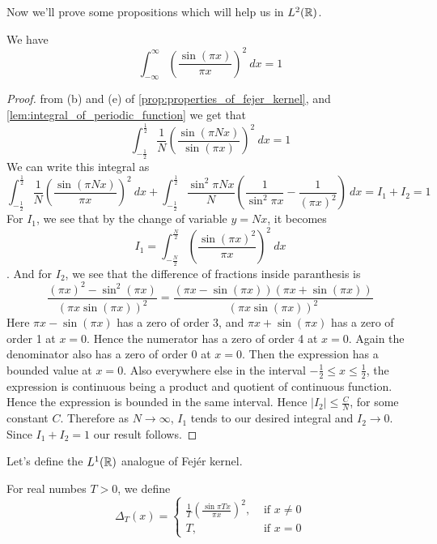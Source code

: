 Now we'll prove some propositions which will help us in $L^2(\mathbb R)$. 
\begin{proposition}
  \label{prop:integral_of_sin(pi_x)^2/(pi_x)^2}
  We have $$\int_{-\infty}^{\infty} \left(\frac{\sin(\pi x)}{\pi x}\right)^2 \ dx = 1$$
\end{proposition}
\begin{proof}
  from (b) and (e) of \autoref{prop:properties_of_fejer_kernel}, and \autoref{lem:integral_of_periodic_function} we get that $$\int_{-\frac{1}{2}}^{\frac{1}{2}} \frac{1}{N} \left(\frac{\sin(\pi Nx)}{\sin (\pi x)}\right)^2 \ dx = 1$$
  We can write this integral as $$\int_{-\frac{1}{2}}^{\frac{1}{2}} \frac{1}{N} \left(\frac{\sin(\pi Nx)}{\pi x}\right)^2 \ dx + \int_{-\frac{1}{2}}^{\frac{1}{2}} \frac{\sin^2 \pi Nx}{N} \left( \frac{1}{\sin^2 \pi x} - \frac{1}{(\pi x)^2} \right) \ dx = I_1 + I_2 = 1 $$
  For $I_1$, we see that by the change of variable $y = Nx$, it becomes $$I_1 = \int_{-\frac{N}{2}}^{\frac{N}{2}} \left(\frac{\sin(\pi x)^2}{\pi x}\right)^2 \ dx $$. 
  And for $I_2$, we see that the difference of fractions inside paranthesis is $$\frac{(\pi x)^2 - \sin^2(\pi x)}{(\pi x \sin(\pi x))^2} = \frac{(\pi x - \sin(\pi x))(\pi x + \sin(\pi x))}{(\pi x \sin(\pi x))^2}$$
  Here $\pi x - \sin(\pi x)$ has a zero of order 3, and $\pi x + \sin(\pi x)$ has a zero of order 1 at $x=0$. Hence the numerator has a zero of order 4 at $x=0$. Again the denominator also has a zero of order 0 at $x=0$. Then the expression has a bounded value at $x=0$. Also everywhere else in the interval $-\frac{1}{2} \le x \le \frac{1}{2}$, the expression is continuous being a product and quotient of continuous function. Hence the expression is bounded in the same interval. Hence $|I_2| \le \frac{C}{N}$, for some constant $C$. Therefore as $N \to \infty$, $I_1$ tends to our desired integral and $I_2 \to 0$. Since $I_1 + I_2 = 1$ our result follows. 
\end{proof}

Let's define the $L^1(\mathbb R)$ analogue of Fej\'er kernel. 
\begin{definition}
  For real numbes $T > 0$, we define 
  \label{def:L1(R)_analogue_of_fejer_kernel}
  $$\Delta_T(x) =
  \begin{cases}
    \frac{1}{T}\left(\frac{\sin \pi Tx}{\pi x}\right)^2, &\text{ if }x \neq 0\\
    T, &\text{ if } x=0
  \end{cases}$$
\end{definition}

